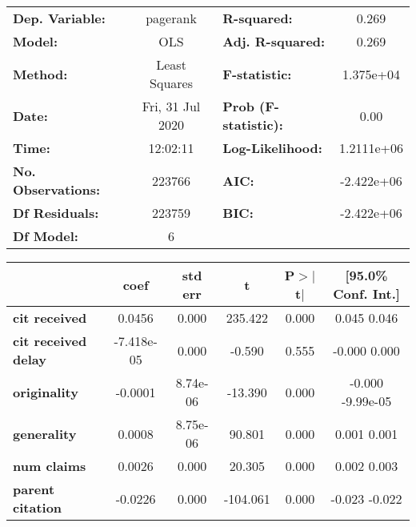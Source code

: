 \begin{center}
\begin{tabular}{lclc}
\toprule
\textbf{Dep. Variable:}     &     pagerank     & \textbf{  R-squared:         } &       0.269    \\
\textbf{Model:}             &       OLS        & \textbf{  Adj. R-squared:    } &       0.269    \\
\textbf{Method:}            &  Least Squares   & \textbf{  F-statistic:       } &   1.375e+04    \\
\textbf{Date:}              & Fri, 31 Jul 2020 & \textbf{  Prob (F-statistic):} &       0.00     \\
\textbf{Time:}              &     12:02:11     & \textbf{  Log-Likelihood:    } &   1.2111e+06   \\
\textbf{No. Observations:}  &      223766      & \textbf{  AIC:               } &   -2.422e+06   \\
\textbf{Df Residuals:}      &      223759      & \textbf{  BIC:               } &   -2.422e+06   \\
\textbf{Df Model:}          &           6      & \textbf{                     } &                \\
\bottomrule
\end{tabular}
\begin{tabular}{lccccc}
                            & \textbf{coef} & \textbf{std err} & \textbf{t} & \textbf{P$>$$|$t$|$} & \textbf{[95.0\% Conf. Int.]}  \\
\midrule
\textbf{cit received}       &       0.0456  &        0.000     &   235.422  &         0.000        &         0.045     0.046       \\
\textbf{cit received delay} &   -7.418e-05  &        0.000     &    -0.590  &         0.555        &        -0.000     0.000       \\
\textbf{originality}        &      -0.0001  &     8.74e-06     &   -13.390  &         0.000        &        -0.000 -9.99e-05       \\
\textbf{generality}         &       0.0008  &     8.75e-06     &    90.801  &         0.000        &         0.001     0.001       \\
\textbf{num claims}         &       0.0026  &        0.000     &    20.305  &         0.000        &         0.002     0.003       \\
\textbf{parent citation}    &      -0.0226  &        0.000     &  -104.061  &         0.000        &        -0.023    -0.022       \\

\end{tabular}
\end{center}
